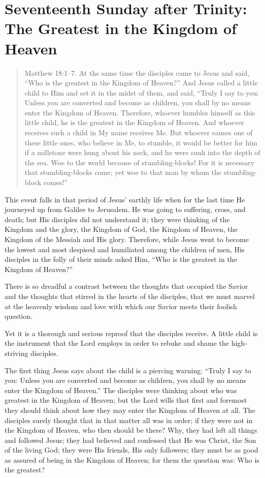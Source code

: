 

\section{Seventeenth Sunday after Trinity: The Greatest in the Kingdom of Heaven}

\begin{quote}

Matthew 18:1–7. At the same time the disciples came to Jesus and said, “Who is the greatest in the Kingdom of Heaven?” And Jesus called a little child to Him and set it in the midst of them, and said, “Truly I say to you: Unless you are converted and become as children, you shall by no means enter the Kingdom of Heaven. Therefore, whoever humbles himself as this little child, he is the greatest in the Kingdom of Heaven. And whoever receives such a child in My name receives Me. But whoever causes one of these little ones, who believe in Me, to stumble, it would be better for him if a millstone were hung about his neck, and he were sunk into the depth of the sea. Woe to the world because of stumbling-blocks! For it is necessary that stumbling-blocks come; yet woe to that man by whom the stumbling-block comes!”

\end{quote}

\bigskip

This event falls in that period of Jesus’ earthly life when for the last time He journeyed up from Galilee to Jerusalem. He was going to suffering, cross, and death; but His disciples did not understand it; they were thinking of the Kingdom and the glory, the Kingdom of God, the Kingdom of Heaven, the Kingdom of the Messiah and His glory. Therefore, while Jesus went to become the lowest and most despised and humiliated among the children of men, His disciples in the folly of their minds asked Him, “Who is the greatest in the Kingdom of Heaven?”

There is so dreadful a contrast between the thoughts that occupied the Savior and the thoughts that stirred in the hearts of the disciples, that we must marvel at the heavenly wisdom and love with which our Savior meets their foolish question.

Yet it is a thorough and serious reproof that the disciples receive. A little child is the instrument that the Lord employs in order to rebuke and shame the high-striving disciples.

The first thing Jesus says about the child is a piercing warning: “Truly I say to you: Unless you are converted and become as children, you shall by no means enter the Kingdom of Heaven.” The disciples were thinking about who was greatest in the Kingdom of Heaven; but the Lord wills that first and foremost they should think about how they may enter the Kingdom of Heaven at all. The disciples surely thought that in that matter all was in order; if they were not in the Kingdom of Heaven, who then should be there? Why, they had left all things and followed Jesus; they had believed and confessed that He was Christ, the Son of the living God; they were His friends, His only followers; they must be as good as assured of being in the Kingdom of Heaven; for them the question was: Who is the greatest?

